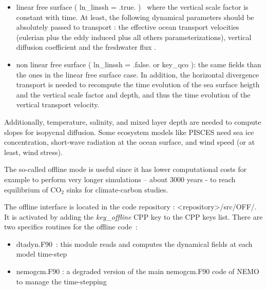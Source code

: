 \documentclass[../main/TOP_manual]{subfiles}
\begin{document}
\begin{itemize}
	\item linear free surface ( ln\_linssh = .true. )  where the vertical scale factor is constant with time. At least, the following dynamical parameters should be absolutely passed
	to transport : the effective ocean transport velocities (eulerian plus the eddy induced plus all others parameterizations), vertical diffusion coefficient and the freshwater flux
.
	\item non linear free surface ( ln\_linssh = .false. or key\_qco ): the same fields than the ones in the linear free surface case. In addition, the horizontal divergence transport is needed to  recompute the time evolution of the sea surface heigth and the vertical scale factor and depth, and thus the time evolution of the vertical transport velocity.
\end{itemize}

Additionally, temperature, salinity, and mixed layer depth are needed to compute slopes for isopycnal diffusion. Some ecosystem models like PISCES need sea ice concentration, short-wave radiation at the ocean surface, and wind speed (or at least, wind stress). 

The so-called offline mode is useful since it has lower computational costs for example to perform very longer simulations – about 3000 years - to reach equilibrium of CO$_{2}$ sinks for climate-carbon studies.

The offline interface is located in the code repository : <repository>/src/OFF/. It is activated by adding the\textit{ key\_offline} CPP key to the CPP keys list. 
There are two specifics routines for the offline code :
\begin{itemize}
	\item dtadyn.F90 : this module reads and computes the dynamical fields at
each model time-step
	\item nemogcm.F90 : a degraded version of the main nemogcm.F90 code of NEMO to
manage the time-stepping
\end{itemize}
\end{document}
